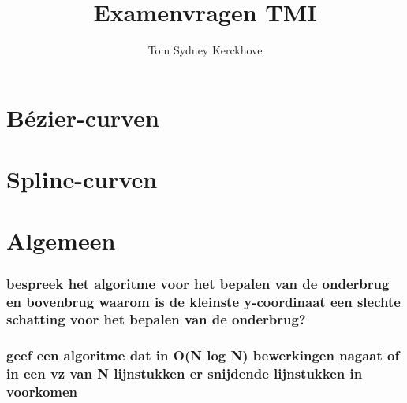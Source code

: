 \documentclass[12pt,a4paper]{article}
\author{Tom Sydney Kerckhove}
\title{Examenvragen TMI}
\begin{document}
\pagebreak





\part{B\'ezier-curven}




\iffalse
\section{Bespreek subdivisie en geef de methode.}
\section{Bespreek graadverhoding, geef het bewijs en leg uit waarvoor het dient.}
\section{Bespreek tensorproductoppervlakken aan de hand van B\'ezier-oppervlakken.}
\section{Bereken de tweede partiele afgeleide in de hoekpunten van een B\'ezier-oppervlak, leg uit en geef grafisch weer.}
\fi

\part{Spline-curven}






\part{Algemeen}


\iffalse
\section{bespreek het algoritme voor het bepalen van de onderbrug en bovenbrug waarom is de kleinste y-coordinaat een slechte schatting voor het bepalen van de onderbrug?}
\section{geef een algoritme dat in O(N log N) bewerkingen nagaat of in een vz van N lijnstukken er snijdende lijnstukken in voorkomen}
\end{document}
